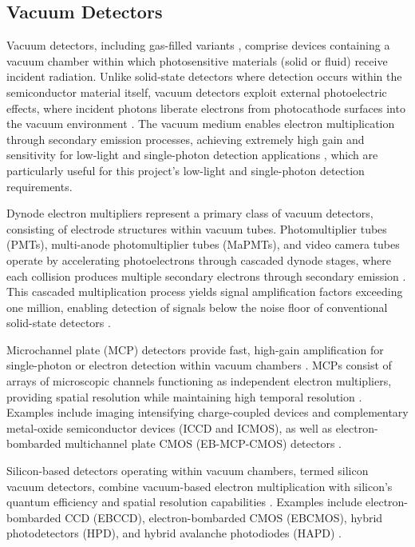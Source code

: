 \documentclass[12pt,a4paper,oneside]{report}
\begin{document}
\subsection{Vacuum Detectors}
\label{subsec:vacuum_detectors}

Vacuum detectors, including gas-filled variants \cite{kolanoski2020}, comprise devices containing a vacuum chamber within which photosensitive materials (solid or fluid) receive incident radiation. Unlike solid-state detectors where detection occurs within the semiconductor material itself, vacuum detectors exploit external photoelectric effects, where incident photons liberate electrons from photocathode surfaces into the vacuum environment \cite{bass2010}. The vacuum medium enables electron multiplication through secondary emission processes, achieving extremely high gain and sensitivity for low-light and single-photon detection applications \cite{bass2010,kolanoski2020}, which are particularly useful for this project's low-light and single-photon detection requirements.

Dynode electron multipliers represent a primary class of vacuum detectors, consisting of electrode structures within vacuum tubes. Photomultiplier tubes (PMTs), multi-anode photomultiplier tubes (MaPMTs), and video camera tubes operate by accelerating photoelectrons through cascaded dynode stages, where each collision produces multiple secondary electrons through secondary emission \cite{bass2010}. This cascaded multiplication process yields signal amplification factors exceeding one million, enabling detection of signals below the noise floor of conventional solid-state detectors \cite{bass2010}.

Microchannel plate (MCP) detectors provide fast, high-gain amplification for single-photon or electron detection within vacuum chambers \cite{bass2010}. MCPs consist of arrays of microscopic channels functioning as independent electron multipliers, providing spatial resolution while maintaining high temporal resolution \cite{bass2010}. Examples include imaging intensifying charge-coupled devices and complementary metal-oxide semiconductor devices (ICCD and ICMOS), as well as electron-bombarded multichannel plate CMOS (EB-MCP-CMOS) detectors \cite{bass2010}.

Silicon-based detectors operating within vacuum chambers, termed silicon vacuum detectors, combine vacuum-based electron multiplication with silicon's quantum efficiency and spatial resolution capabilities \cite{bass2010}. Examples include electron-bombarded CCD (EBCCD), electron-bombarded CMOS (EBCMOS), hybrid photodetectors (HPD), and hybrid avalanche photodiodes (HAPD) \cite{bass2010}.
\end{document}
